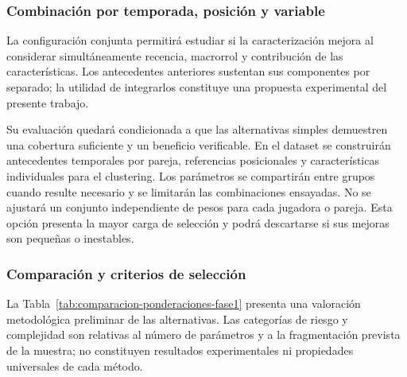 \subsubsection{Combinación por temporada, posición y variable}
\label{subsubsec:ponderacion-temporada-posicion-variable}
La configuración conjunta permitirá estudiar si la caracterización mejora al considerar simultáneamente recencia, macrorrol y contribución de las características. Los antecedentes anteriores sustentan sus componentes por separado; la utilidad de integrarlos constituye una propuesta experimental del presente trabajo.

Su evaluación quedará condicionada a que las alternativas simples demuestren una cobertura suficiente y un beneficio verificable. En el dataset se construirán antecedentes temporales por pareja, referencias posicionales y características individuales para el clustering. Los parámetros se compartirán entre grupos cuando resulte necesario y se limitarán las combinaciones ensayadas. No se ajustará un conjunto independiente de pesos para cada jugadora o pareja. Esta opción presenta la mayor carga de selección y podrá descartarse si sus mejoras son pequeñas o inestables.

\subsubsection{Comparación y criterios de selección}
\label{subsubsec:comparacion-ponderaciones}
La Tabla~\ref{tab:comparacion-ponderaciones-fase1} presenta una valoración metodológica preliminar de las alternativas. Las categorías de riesgo y complejidad son relativas al número de parámetros y a la fragmentación prevista de la muestra; no constituyen resultados experimentales ni propiedades universales de cada método.

